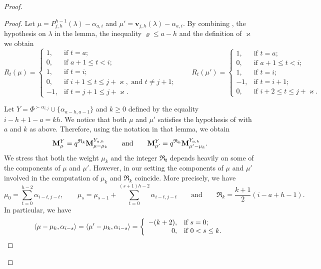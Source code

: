 \begin{proof}
\begin{proof}
    Let $\mu= P_{j,h}^{h-1}(\lambda) - \alpha_{a,i}$ and $\mu' = \mathbf{v}_{j,h}(\lambda)-\alpha_{a,i}$. 
By combining , the hypothesis on $\lambda$ in the lemma, the inequality $\varrho \leq a-h$ and the definition of $\varkappa$ we obtain 
\begin{equation}
    R_t(\mu) = \left\{\begin{array}{rl}
        1, & \text{if } t=a;\\
        0, & \text{if } a+1\leq t < i;\\
        1, & \text{if } t=i;\\
        0, & \text{if } i+1\leq t\leq j+\varkappa, \text{ and } t\neq j+1;\\
        -1, &\text{if } t = j+1\leq j+\varkappa.
    \end{array}\right.
    \qquad  R_t(\mu') = \left\{\begin{array}{rl}
        1, & \text{if } t=a;\\
        0, & \text{if } a+1\leq t < i;\\
        1, & \text{if } t=i;\\
        -1, & \text{if } t= i+1;\\
        0, & \text{if } i+2\leq t\leq j+\varkappa.
    \end{array}\right.
\end{equation}

    
    Let $Y=\Phi^{\succ\alpha_{i,j}} \cup \{ \alpha_{a-h,a-1} \}$ and $k\geq 0$ defined by the equality $i-h+1-a=kh$.  
    We notice that both $\mu$ and $\mu'$ satisfies the hypothesis of  with $a$ and $k$ as above. Therefore,  using the notation in that lemma, we obtain 
    \begin{equation} \label{eq: alternativa 1}
        \mathbf{M}_{\mu}^{Y} = q^{\mathfrak{R}_k}\mathbf{M}_{\mu- \mu_k}^{Y_{a,k}}  \qquad \mbox{and} \qquad   \mathbf{M}_{\mu'}^{Y} = q^{\mathfrak{R}_k}\mathbf{M}_{\mu'- \mu_k}^{Y_{a,k}}.
    \end{equation}
    We stress that both the weight $\mu_k$ and the integer $\mathfrak{R_k}$ depends heavily on some of the components of $\mu$ and $\mu'$. 
    However, in our setting the components of $\mu$ and $\mu'$ involved in the computation of   $\mu_k$ and $\mathfrak{R}_k$ coincide. 
    More precisely, we have 
    \begin{equation}
        \mu_0 = \sum_{t=0}^{h-2} \alpha_{i-t,j-t}, \qquad \mu_{s} = \mu_{s-1} + \sum_{t=0}^{(s+1)h-2}    \alpha_{i-t,j-t}    \qquad \mbox{and} \qquad \mathfrak{R}_{k} =  \frac{k+1}{2}(i-a+h-1) .
    \end{equation}
In particular, we have
\begin{equation}
    \langle \mu-\mu_k , \alpha_{i-s} \rangle= \langle \mu'-\mu_k , \alpha_{i-s} \rangle = \left\{ \begin{array}{rl}
        -(k+2) , & \mbox{if } s=0;  \\
         0 ,& \mbox{if } 0<s\leq k. 
    \end{array}
    \right.
\end{equation}
    

\end{proof}
\end{proof}
